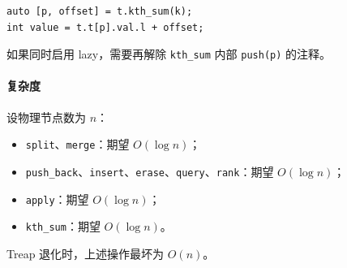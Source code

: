 \begin{verbatim}
auto [p, offset] = t.kth_sum(k);
int value = t.t[p].val.l + offset;
\end{verbatim}

如果同时启用 lazy，需要再解除 \texttt{kth\_sum} 内部 \texttt{push(p)} 的注释。

\paragraph*{复杂度}

设物理节点数为 $n$：

\begin{itemize}
  \item \texttt{split}、\texttt{merge}：期望 $O(\log n)$；
  \item \texttt{push\_back}、\texttt{insert}、\texttt{erase}、\texttt{query}、\texttt{rank}：期望 $O(\log n)$；
  \item \texttt{apply}：期望 $O(\log n)$；
  \item \texttt{kth\_sum}：期望 $O(\log n)$。
\end{itemize}

Treap 退化时，上述操作最坏为 $O(n)$。
